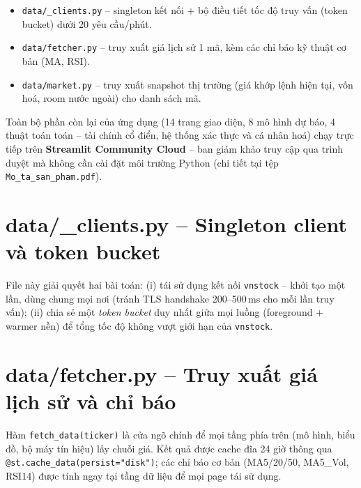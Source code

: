 \documentclass[12pt,a4paper]{article}
\begin{document}
\begin{itemize}
  \item \texttt{data/\_clients.py} -- singleton kết nối + bộ điều tiết
        tốc độ truy vấn (token bucket) dưới 20 yêu cầu/phút.
  \item \texttt{data/fetcher.py} -- truy xuất giá lịch sử 1 mã, kèm
        các chỉ báo kỹ thuật cơ bản (MA, RSI).
  \item \texttt{data/market.py} -- truy xuất snapshot thị trường (giá
        khớp lệnh hiện tại, vốn hoá, room nước ngoài) cho danh sách mã.
\end{itemize}

Toàn bộ phần còn lại của ứng dụng (14 trang giao diện, 8 mô hình dự
báo, 4 thuật toán toán -- tài chính cổ điển, hệ thống xác thực và cá
nhân hoá) chạy trực tiếp trên \textbf{Streamlit Community Cloud} --
ban giám khảo truy cập qua trình duyệt mà không cần cài đặt môi
trường Python (chi tiết tại tệp \texttt{Mo\_ta\_san\_pham.pdf}).

\section{data/\_clients.py -- Singleton client và token bucket}

\noindent File này giải quyết hai bài toán: (i) tái sử dụng kết nối
\texttt{vnstock} -- khởi tạo một lần, dùng chung mọi nơi (tránh
TLS handshake 200--500\,ms cho mỗi lần truy vấn); (ii) chia sẻ một
\emph{token bucket} duy nhất giữa mọi luồng (foreground + warmer
nền) để tổng tốc độ không vượt giới hạn của \texttt{vnstock}.


\section{data/fetcher.py -- Truy xuất giá lịch sử và chỉ báo}

\noindent Hàm \texttt{fetch\_data(ticker)} là cửa ngõ chính để mọi tầng
phía trên (mô hình, biểu đồ, bộ máy tín hiệu) lấy chuỗi giá. Kết quả
được cache đĩa 24 giờ thông qua \texttt{@st.cache\_data(persist="disk")};
các chỉ báo cơ bản (MA5/20/50, MA5\_Vol, RSI14) được tính ngay tại tầng
dữ liệu để mọi page tái sử dụng.
\end{document}
